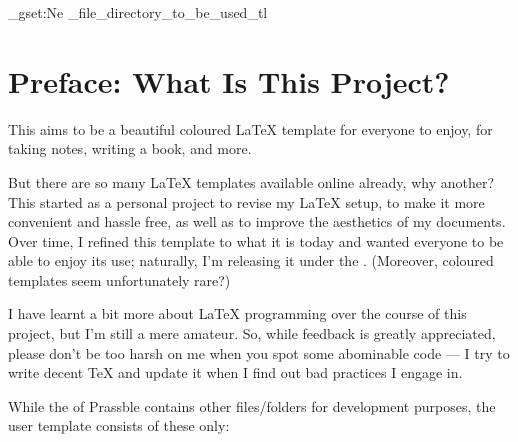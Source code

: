 \documentclass[11pt, a4paper]{book}
\begin{document}
\ExplSyntaxOn
    \tl_gset:Ne \g_file_directory_to_be_used_tl {}
\ExplSyntaxOff
\frontmatter
{}
\thispagestyle{empty} 
%
\chapter{Preface: What Is This Project?}
This aims to be a beautiful coloured {\LaTeX} template for everyone to enjoy, for taking notes, writing a book, and more. 

But there are so many {\LaTeX} templates available online already, why another? This started as a personal project to revise my {\LaTeX} setup, to make it more convenient and hassle free, as well as to improve the aesthetics of my documents. Over time, I refined this template to what it is today and wanted everyone to be able to enjoy its use; naturally, I'm releasing it under the . (Moreover, coloured templates seem unfortunately rare?)

I have learnt a bit more about {\LaTeX} programming over the course of this project, but I'm still a mere amateur. So, while feedback is greatly appreciated, please don't be too harsh on me when you spot some abominable code --- I try to write decent {\TeX} and update it when I find out bad practices I engage in.
%
\tableofcontents
\thispagestyle{empty}
\newpage
\setcounter{page}{1}
%
\mainmatter
{}
While the  of Prassble contains other files/folders for development purposes, the user template consists of these only:

%
\backmatter
\end{document}
